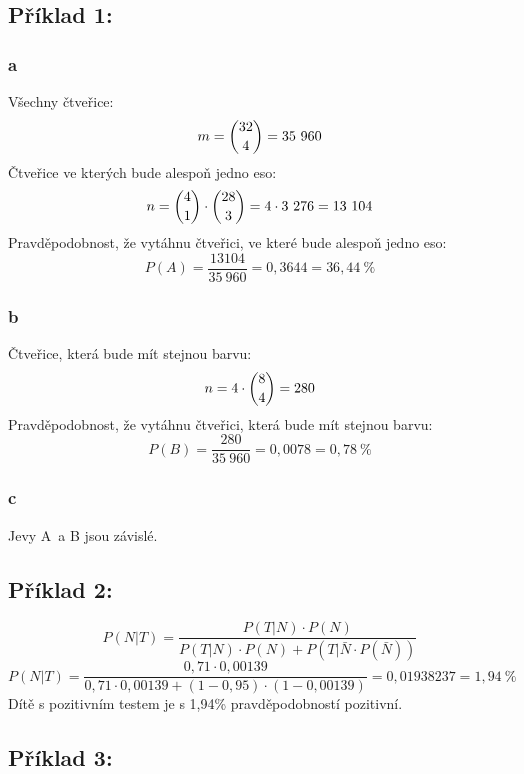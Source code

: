 \documentclass[twoside]{article}\usepackage[]{graphicx}\usepackage[]{color}
\begin{document}
\subsection*{Příklad 1:}
\subsubsection*{a}
Všechny čtveřice:
\[ m = \dbinom{32}{4} = 35\ 960\]
Čtveřice ve kterých bude alespoň jedno eso:
\[ n = \dbinom{4}{1} \cdot \dbinom{28}{3} = 4 \cdot 3\ 276 = 13 104\]
Pravděpodobnost, že vytáhnu čtveřici, ve které bude alespoň jedno eso:
\[ P(A) = \frac{13 104}{35\ 960} =  0,3644 = 36,44\ \%\]

\subsubsection*{b}
Čtveřice, která bude mít stejnou barvu:
\[ n = 4 \cdot \dbinom{8}{4} = 280 \]
Pravděpodobnost, že vytáhnu čtveřici, která bude mít stejnou barvu:
\[ P(B) = \frac{280}{35\ 960} =  0,0078 = 0,78\ \%\]

\subsubsection*{c}
Jevy A~a B jsou závislé.

\subsection*{Příklad 2:}
\[ P(N|T) = \frac{P(T|N) \cdot P(N)}{P(T|N) \cdot P(N) + P(T|\bar{N} \cdot P(\bar{N}))}\]
\[ P(N|T) = \frac{0,71 \cdot 0,00139}{0,71 \cdot 0,00139 + (1 - 0,95) \cdot (1 - 0,00139)} = 0,01938237 = 1,94\ \%\]
Dítě s pozitivním testem je s 1,94\% pravděpodobností pozitivní.
\subsection*{Příklad 3:}
\end{document}
